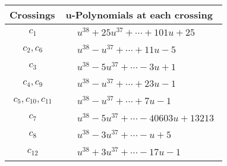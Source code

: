 \documentclass[1p]{elsarticle_modified}
\theoremstyle{definition}
\begin{document}
\begin{tabular}{m{50pt}|m{274pt}}
Crossings & \hspace{64pt}u-Polynomials at each crossing \\
\hline $$\begin{aligned}c_{1}\end{aligned}$$&$\begin{aligned}
&u^{38}+25 u^{37}+\cdots+101 u+25
\end{aligned}$\\
\hline $$\begin{aligned}c_{2},c_{6}\end{aligned}$$&$\begin{aligned}
&u^{38}- u^{37}+\cdots+11 u-5
\end{aligned}$\\
\hline $$\begin{aligned}c_{3}\end{aligned}$$&$\begin{aligned}
&u^{38}-5 u^{37}+\cdots-3 u+1
\end{aligned}$\\
\hline $$\begin{aligned}c_{4},c_{9}\end{aligned}$$&$\begin{aligned}
&u^{38}- u^{37}+\cdots+23 u-1
\end{aligned}$\\
\hline $$\begin{aligned}c_{5},c_{10},c_{11}\end{aligned}$$&$\begin{aligned}
&u^{38}- u^{37}+\cdots+7 u-1
\end{aligned}$\\
\hline $$\begin{aligned}c_{7}\end{aligned}$$&$\begin{aligned}
&u^{38}-5 u^{37}+\cdots-40603 u+13213
\end{aligned}$\\
\hline $$\begin{aligned}c_{8}\end{aligned}$$&$\begin{aligned}
&u^{38}-3 u^{37}+\cdots- u+5
\end{aligned}$\\
\hline $$\begin{aligned}c_{12}\end{aligned}$$&$\begin{aligned}
&u^{38}+3 u^{37}+\cdots-17 u-1
\end{aligned}$\\
\hline
\end{tabular}\\~\\
\end{document}
